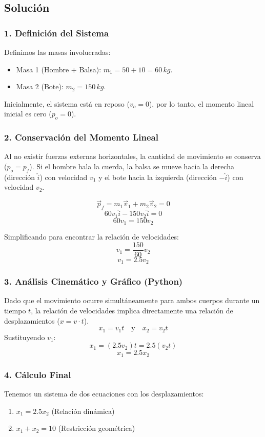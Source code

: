 \documentclass[12pt, a4paper]{article}
\begin{document}
\subsection*{Solución}

\subsubsection*{1. Definición del Sistema}
Definimos las masas involucradas:
\begin{itemize}
    \item Masa 1 (Hombre + Balsa): $m_1 = 50 + 10 = 60 \, \si{kg}$.
    \item Masa 2 (Bote): $m_2 = 150 \, \si{kg}$.
\end{itemize}
Inicialmente, el sistema está en reposo ($v_o = 0$), por lo tanto, el momento lineal inicial es cero ($p_o = 0$).

\subsubsection*{2. Conservación del Momento Lineal}
Al no existir fuerzas externas horizontales, la cantidad de movimiento se conserva ($p_o = p_f$).
Si el hombre hala la cuerda, la balsa se mueve hacia la derecha (dirección $\hat{i}$) con velocidad $v_1$ y el bote hacia la izquierda (dirección $-\hat{i}$) con velocidad $v_2$.

$$ \vec{p}_f = m_1 \vec{v}_1 + m_2 \vec{v}_2 = 0 $$
$$ 60 v_1 \hat{i} - 150 v_2 \hat{i} = 0 $$
$$ 60 v_1 = 150 v_2 $$

Simplificando para encontrar la relación de velocidades:
$$ v_1 = \frac{150}{60} v_2 $$
$$ v_1 = 2.5 v_2 $$

\subsubsection*{3. Análisis Cinemático y Gráfico (Python)}
Dado que el movimiento ocurre simultáneamente para ambos cuerpos durante un tiempo $t$, la relación de velocidades implica directamente una relación de desplazamientos ($x = v \cdot t$).
$$ x_1 = v_1 t \quad \text{y} \quad x_2 = v_2 t $$
Sustituyendo $v_1$:
$$ x_1 = (2.5 v_2) t = 2.5 (v_2 t) $$
$$ x_1 = 2.5 x_2 $$

\subsubsection*{4. Cálculo Final}
Tenemos un sistema de dos ecuaciones con los desplazamientos:
\begin{enumerate}
    \item $x_1 = 2.5 x_2$ (Relación dinámica)
    \item $x_1 + x_2 = 10$ (Restricción geométrica)
\end{enumerate}
\end{document}
